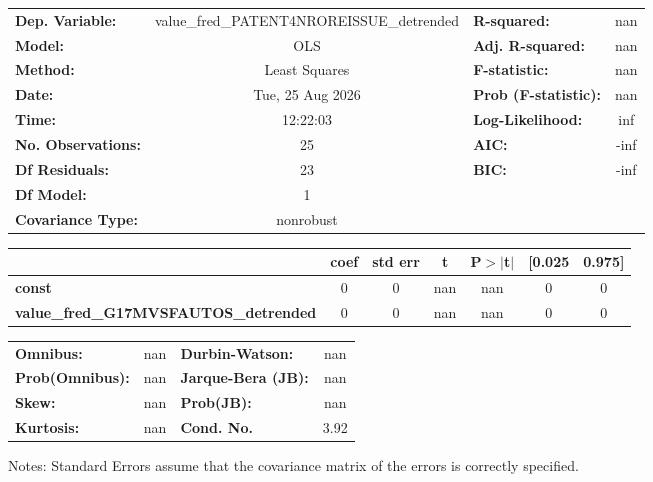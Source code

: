 \begin{center}
\begin{tabular}{lclc}
\toprule
\textbf{Dep. Variable:}                       & value\_fred\_PATENT4NROREISSUE\_detrended & \textbf{  R-squared:         } &       nan   \\
\textbf{Model:}                               &                    OLS                    & \textbf{  Adj. R-squared:    } &       nan   \\
\textbf{Method:}                              &               Least Squares               & \textbf{  F-statistic:       } &       nan   \\
\textbf{Date:}                                &              Tue, 25 Aug 2026             & \textbf{  Prob (F-statistic):} &      nan    \\
\textbf{Time:}                                &                  12:22:03                 & \textbf{  Log-Likelihood:    } &       inf   \\
\textbf{No. Observations:}                    &                       25                  & \textbf{  AIC:               } &      -inf   \\
\textbf{Df Residuals:}                        &                       23                  & \textbf{  BIC:               } &      -inf   \\
\textbf{Df Model:}                            &                        1                  & \textbf{                     } &             \\
\textbf{Covariance Type:}                     &                 nonrobust                 & \textbf{                     } &             \\
\bottomrule
\end{tabular}
\begin{tabular}{lcccccc}
                                              & \textbf{coef} & \textbf{std err} & \textbf{t} & \textbf{P$> |$t$|$} & \textbf{[0.025} & \textbf{0.975]}  \\
\midrule
\textbf{const}                                &            0  &            0     &       nan  &           nan        &            0    &            0     \\
\textbf{value\_fred\_G17MVSFAUTOS\_detrended} &            0  &            0     &       nan  &           nan        &            0    &            0     \\
\bottomrule
\end{tabular}
\begin{tabular}{lclc}
\textbf{Omnibus:}       &    nan & \textbf{  Durbin-Watson:     } &      nan  \\
\textbf{Prob(Omnibus):} &    nan & \textbf{  Jarque-Bera (JB):  } &      nan  \\
\textbf{Skew:}          &    nan & \textbf{  Prob(JB):          } &      nan  \\
\textbf{Kurtosis:}      &    nan & \textbf{  Cond. No.          } &     3.92  \\
\bottomrule
\end{tabular}
\end{center}

Notes: \newline
 [1] Standard Errors assume that the covariance matrix of the errors is correctly specified.